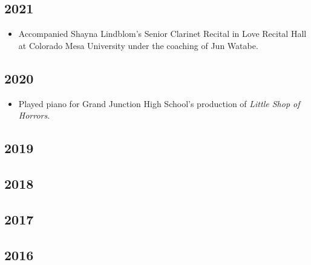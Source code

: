 \documentclass{article}
\newcommand{\cvItem}[1]{
        \item {
            {#1}
        }
    }
\newcommand{\cvItemListStart}{\begin{itemize}[leftmargin=10pt]}
\newcommand{\cvItemListEnd}{\end{itemize}}
\begin{document}
        \subsection{2021}
            \cvItemListStart
                \cvItem{Accompanied Shayna Lindblom's Senior Clarinet Recital in Love Recital Hall
                at Colorado Mesa University under the coaching of Jun Watabe.}
            \cvItemListEnd
        \subsection{2020}
            \cvItemListStart
                \cvItem{Played piano for Grand Junction High School's production of {\em Little Shop
                of Horrors}.}
            \cvItemListEnd
        \subsection{2019}
        \subsection{2018}
        \subsection{2017}
        \subsection{2016}
\end{document}
